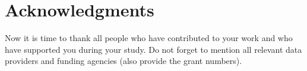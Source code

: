\chapter*{Acknowledgments}
\thispagestyle{plain}

Now it is time to thank all people who have contributed to your work and who
have supported you during your study. Do not forget to mention all relevant data
providers and funding agencies (also provide the grant numbers).
